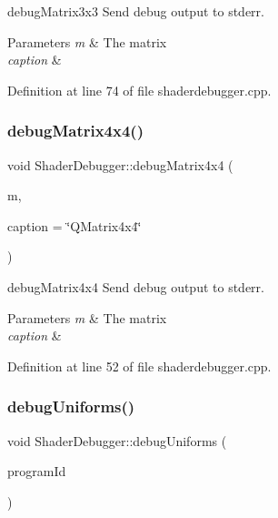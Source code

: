 debug\+Matrix3x3 Send debug output to stderr. 


\begin{DoxyParams}{Parameters}
{\em m} & The matrix \\
\hline
{\em caption} & \\
\hline
\end{DoxyParams}


Definition at line 74 of file shaderdebugger.\+cpp.

\mbox{\label{class_shader_debugger_a45249372f2e0c1e5bda7d200bb0dbfa8}} 
\subsubsection{\texorpdfstring{debugMatrix4x4()}{debugMatrix4x4()}}
{\footnotesize\ttfamily void Shader\+Debugger\+::debug\+Matrix4x4 (\begin{DoxyParamCaption}\item[{const Q\+Matrix4x4 \&}]{m,  }\item[{const Q\+String \&}]{caption = {\ttfamily \char`\"{}QMatrix4x4\char`\"{}} }\end{DoxyParamCaption})\hspace{0.3cm}{\ttfamily [static]}}



debug\+Matrix4x4 Send debug output to stderr. 


\begin{DoxyParams}{Parameters}
{\em m} & The matrix \\
\hline
{\em caption} & \\
\hline
\end{DoxyParams}


Definition at line 52 of file shaderdebugger.\+cpp.

\mbox{\label{class_shader_debugger_abe24abd2ac69db02f63c2fb4fc829080}} 
\subsubsection{\texorpdfstring{debugUniforms()}{debugUniforms()}}
{\footnotesize\ttfamily void Shader\+Debugger\+::debug\+Uniforms (\begin{DoxyParamCaption}\item[{int}]{program\+Id }\end{DoxyParamCaption})\hspace{0.3cm}{\ttfamily [static]}}

